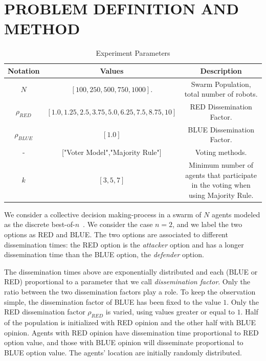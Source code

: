 \documentclass[journal]{IEEEtran}
\begin{document}
\section{PROBLEM DEFINITION AND METHOD}
\label{sec:method}


\begin{table}[t]
\caption{Experiment Parameters}
\label{params-table}
\centering
\begin{tabular}{|c|c|c|}
\hline
Notation & Values &
Description
\\
\hline
$N$
&
$[100, 250, 500, 750, 1000]$.
&
Swarm Population, total number of robots.\\
\hline
$\rho_{RED}$
&
$[1.0, 1.25, 2.5, 3.75, 5.0, 6.25, 7.5, 8.75, 10]$
&
RED Dissemination Factor.\\
\hline
$\rho_{BLUE}$
&
$[1.0]$
&
BLUE Dissemination Factor.\\

\hline
-
&
["Voter Model","Majority Rule"]
&
Voting methods.
\\
\hline
$k$
&
$[3,5,7]$
&
Minimum number of agents that participate in the voting when using Majority Rule.
\\
\hline
\end{tabular}
\end{table}


We consider a collective decision making-process in a swarm of $N$ agents modeled as the discrete best-of-$n$~\cite{Valentini2017Review}. We consider the case $n=2$, and we label the two options as RED and BLUE. The two options are associated to different dissemination times: the RED option is the \emph{attacker} option and has a longer dissemination time than the BLUE option, the \emph{defender} option.

The dissemination times above are exponentially distributed and each (BLUE or RED) proportional to a parameter that we call \emph{dissemination factor}.  Only the ratio between the two dissemination factors play a role. %
To keep the observation simple, the dissemination factor of BLUE has been fixed to the value $1$. Only the RED dissemination factor $\rho_{RED}$ is varied, using values greater or equal to $1$. 
Half of the population is initialized with RED opinion and the other half with BLUE opinion. 
Agents with RED opinion have dissemination time  proportional to RED option value, and those with BLUE opinion will disseminate proportional to BLUE option value.  
The agents' location are initially randomly distributed.
\end{document}
